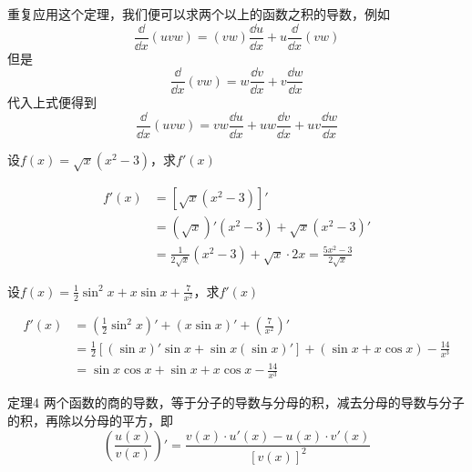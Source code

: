 重复应用这个定理，我们便可以求两个以上的函数之积的导数，例如
\[\frac{\dd }{\dd x}(uvw)=(vw)\frac{\dd u}{\dd x}+u\frac{\dd }{\dd x}(vw)\]
但是
\[\frac{\dd }{\dd x}(vw)=w\frac{\dd v}{\dd x}+v\frac{\dd w}{\dd x}\]
代入上式便得到
\[\frac{\dd }{\dd x}(uvw)=vw\frac{\dd u}{\dd x}+uw\frac{\dd v}{\dd x}+uv\frac{\dd w}{\dd x}\]


\begin{example}
    设$f(x)=\sqrt{x}(x^2-3)$，求$f'(x)$
\end{example}


\begin{solution}
    \begin{align*}
f'(x)&=\left[\sqrt{x}(x^2-3)\right]'\\
&=\left(\sqrt{x}\right)'(x^2-3)+\sqrt{x}(x^2-3)'\\
&=\frac{1}{2\sqrt{x}}(x^2-3)+\sqrt{x}\cdot 2x = \frac{5x^2-3}{2\sqrt{x}}
    \end{align*}
\end{solution}

\begin{example}
    设$f(x)=\frac{1}{2}\sin^2 x+x\sin x+\frac{7}{x^2}$，求$f'(x)$
\end{example}

\begin{solution}
\begin{align*}
    f'(x)&=\left(\frac{1}{2}\sin^2 x\right)'+(x\sin x)'+\left(\frac{7}{x^2}\right)'\\
    &=\frac{1}{2}\left[(\sin x)'\sin x+\sin x(\sin x)'\right]+(\sin x+x\cos x)-\frac{14}{x^3}\\
    &=\sin x\cos x+\sin x+x\cos x-\frac{14}{x^3}
\end{align*}
\end{solution}

\begin{blk}
    {定理4} 两个函数的商的导数，等于分子的导数与分母的积，减去分母的导数与分子的积，再除以分母的平方，即
\[\left(\frac{u(x)}{v(x)}\right)'=\frac{v(x)\cdot u'(x)-u(x)\cdot v'(x)}{[v(x)]^2}\]
\end{blk}

